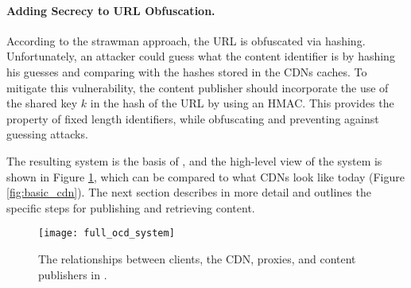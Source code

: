 \paragraph{Adding Secrecy to URL Obfuscation.} According to the strawman approach, the URL is obfuscated via hashing.  Unfortunately, 
an attacker could guess what the content identifier is by hashing his guesses and comparing with the hashes stored in the 
CDNs caches.  To mitigate this vulnerability, the content publisher should incorporate the use of the shared key $k$ in the 
hash of the URL by using an HMAC.  This provides the property of fixed length identifiers, while obfuscating and preventing 
against guessing attacks.  

The resulting system is the basis of \system{}, and the high-level view of the system is shown in Figure \ref{fig:ocd_overview}, 
which can be compared to what CDNs look like today (Figure \ref{fig:basic_cdn}).  The next section describes \system{} in more 
detail and outlines the specific steps for publishing and retrieving content.

\begin{figure}[t]
\centering
\texttt{[image: full\_ocd\_system]}
\caption{The relationships between clients, the CDN, proxies, and content publishers in 
\system{}.}
\label{fig:ocd_overview}
\end{figure}

